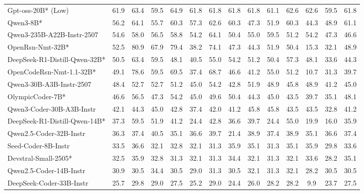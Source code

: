 \begin{table}[hbt]
{\begin{tabular}{l *{13}{c}}
\rowcolor{gray!10}
Gpt-oss-20B* (Low) & 61.9&   63.4&   59.5&   64.9&   61.8&   61.8&   61.8&   61.8&   61.1&   62.6&   62.6&   59.5&   61.8\\											
Qwen3-8B* & 56.2&   64.1&   55.7&   60.3&   57.3&   62.6&   60.3&   47.3&   51.9&   60.3&   44.3&   48.9&   61.1\\						
\rowcolor{gray!10}
Qwen3-235B-A22B-Instr-2507&	54.6&   58.0&   56.5&   58.8&   54.2&   64.1&   50.4&   55.0&   59.5&   51.2&   54.2&   47.3&   46.6\\											
OpenRsn-Nmt-32B* & 52.5&   80.9&   67.9&   79.4&   38.2&   74.1&   47.3&   44.3&   51.9&   50.4&   15.3&   32.1&   48.9\\											
\rowcolor{gray!10}
DeepSeek-R1-Distill-Qwen-32B* & 50.5&   63.4&   59.5&   48.1&   40.5&   55.0&   54.2&   51.2&   50.4&   57.3&   48.1&   33.6&   44.3\\											
OpenCodeRsn-Nmt-1.1-32B* & 49.1&   78.6&   59.5&   69.5&   37.4&   68.7&   46.6&   41.2&   55.0&   51.2&   10.7&   31.3&   39.7\\											
\rowcolor{gray!10}
Qwen3-30B-A3B-Instr-2507&	48.4&   52.7&   52.7&   51.2&   45.0&   54.2&   42.8&   51.9&   48.9&   45.8&   48.9&   41.2&   45.0\\											
OlympicCoder-7B* & 46.6&   56.5&   47.3&   54.2&   45.0&   49.6&   50.4&   44.3&   45.0&   43.5&   39.7&   35.1&   48.1\\											
\rowcolor{gray!10}
Qwen3-Coder-30B-A3B-Instr & 42.1&   44.3&   45.0&   42.8&   37.4&   42.0&   41.2&   45.8&   45.8&   43.5&   43.5&   32.8&   41.2\\											
DeepSeek-R1-Distill-Qwen-14B* & 37.3&   59.5&   51.9&   41.2&   24.4&   42.8&   36.6&   39.7&   24.4&   55.0&   19.9&   16.0&   35.9\\											
\rowcolor{gray!10}
Qwen2.5-Coder-32B-Instr & 36.3&   37.4&   40.5&   35.1&   36.6&   39.7&   21.4&   38.9&   37.4&   38.9&   35.1&   36.6&   37.4\\											
Seed-Coder-8B-Instr & 33.5&   36.6&   32.1&   32.8&   32.1&   31.3&   35.9&   35.1&   31.3&   35.1&   35.9&   29.8&   33.6\\											
\rowcolor{gray!10}
Devstral-Small-2505* & 32.5&   35.9&   32.8&   31.3&   32.1&   31.3&   34.4&   32.1&   31.3&   32.1&   33.6&   28.2&   35.1\\											
Qwen2.5-Coder-14B-Instr & 30.9&   30.5&   34.4&   30.5&   29.0&   31.3&   30.5&   32.1&   31.3&   32.1&   28.2&   30.5&   30.5\\											
\rowcolor{gray!10}
DeepSeek-Coder-33B-Instr & 25.7&   29.8&   29.0&   27.5&   25.2&   29.0&   24.4&   26.0&   28.2&   28.2&   9.9&   23.7&   27.5\\											

\bottomrule
\end{tabular}
}
\end{table}

